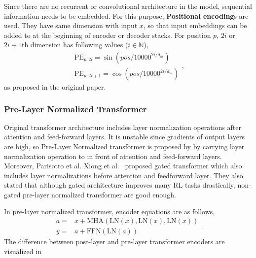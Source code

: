 Since there are no recurrent or convolutional architecture in the model, sequential information needs to be embedded. 
For this purpose, \textbf{Positional encoding}s are used. 
They have same dimension with input $x$, so that input embeddings can be added to at the beginning of encoder or decoder stacks. 
For position $p$, $2i$ or $2i+1$th dimension has following values ($i \in \mathbb{N}$), 
\begin{equation}
\begin{split}
\mathrm{PE}_{p,2i} = \sin(pos/10000^{2i/d_m}) \\
\mathrm{PE}_{p,2i+1} = \cos(pos/10000^{2i/d_m})
\end{split},
\end{equation}
as proposed in the original paper. 

\subsubsection{Pre-Layer Normalized Transformer}

Original transformer architecture includes layer normalization operations after attention and feed-forward layers. 
It is unstable since gradients of output layers are high, so Pre-Layer Normalized transformer is proposed by \cite{xiong_layer_2020} by carrying layer normalization operation to in front of attention and feed-forward layers. 
Moreover, Parisotto et al. Xiong et al.~ \cite{parisotto_stabilizing_2019} proposed gated transformer which also includes layer normalizations before attention and feedforward layer. 
They also stated that although gated architecture improves many RL tasks drastically, non-gated pre-layer normalized transformer are good enough. 

In pre-layer normalized transformer, encoder equations are as follows,
\begin{equation}
\begin{split}
a = & x+ \mathrm{MHA}(\mathrm{LN}(x),\mathrm{LN}(x),\mathrm{LN}(x)) \\
y = & a + \mathrm{FFN}(\mathrm{LN}(a))
\end{split}.
\end{equation}
The difference between post-layer and pre-layer transformer encoders are visualized in 

